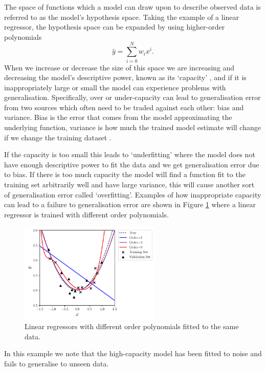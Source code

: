 The space of functions which a model can draw upon to describe observed data is referred to as the model's hypothesis space.
Taking the example of a linear regressor, the hypothesis space can be expanded by using higher-order polynomials
\begin{equation}
    \hat{y} = \sum_{i=0}^{N}w_{i}x^{i}.
\end{equation}
When we increase or decrease the size of this space we are increasing and decreasing the model's descriptive power, known as its `capacity' \cite{DeepLearningBook}, and if it is inappropriately large or small the model can experience problems with generalisation.
Specifically, over or under-capacity can lead to generalisation error from two sources which often need to be traded against each other: bias and variance. Bias is the error that comes from the model approximating the underlying function, variance is how much the trained model estimate will change if we change the training dataset \cite{DeepLearningBook}. 

If the capacity is too small this leads to `underfitting' where the model does not have enough descriptive power to fit the data and we get generalisation error due to bias. If there is too much capacity the model will find a function fit to the training set arbitrarily well and have large variance, this will cause another sort of generalisation error called `overfitting'. Examples of how inappropriate capacity can lead to a failure to generalisation error are shown in Figure \ref{fig:machine_learning:overfitting} where a linear regressor is trained with different order polynomials. 
\begin{figure}[h!]
        \includegraphics[width=0.6\textwidth]{figures/machine_learning/capacity.pdf}
    \caption{Linear regressors with different order polynomials fitted to the same data. }
        \label{fig:machine_learning:overfitting}
\end{figure}
In this example we note that the high-capacity model has been fitted to noise and fails to generalise to unseen data. 

